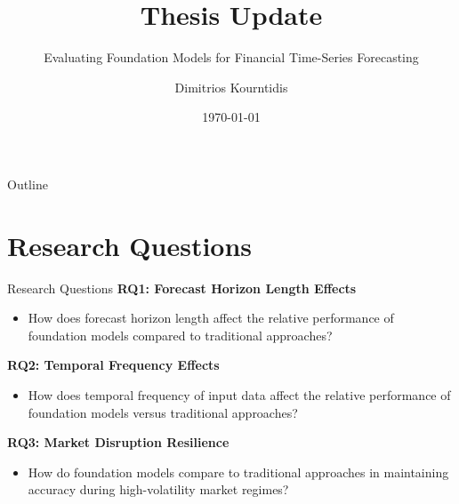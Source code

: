 \documentclass[aspectratio=169]{beamer}
\title{Thesis Update}
\subtitle{Evaluating Foundation Models for Financial Time-Series Forecasting}
\author{Dimitrios Kourntidis}
\institute{Leiden University}
\date{\today}
\begin{document}
\begin{frame}
\titlepage
\end{frame}

\begin{frame}{Outline}
\tableofcontents
\end{frame}

\section{Research Questions}




\begin{frame}{Research Questions}
\textbf{RQ1: Forecast Horizon Length Effects}
\begin{itemize}
\item How does forecast horizon length affect the relative performance of foundation models compared to traditional approaches?
\end{itemize}

\vspace{0.5em}

\textbf{RQ2: Temporal Frequency Effects}
\begin{itemize}
\item How does temporal frequency of input data affect the relative performance of foundation models versus traditional approaches?
\end{itemize}

\vspace{0.5em}

\textbf{RQ3: Market Disruption Resilience}
\begin{itemize}
\item How do foundation models compare to traditional approaches in maintaining accuracy during high-volatility market regimes?
\end{itemize}
\end{frame}
\end{document}
